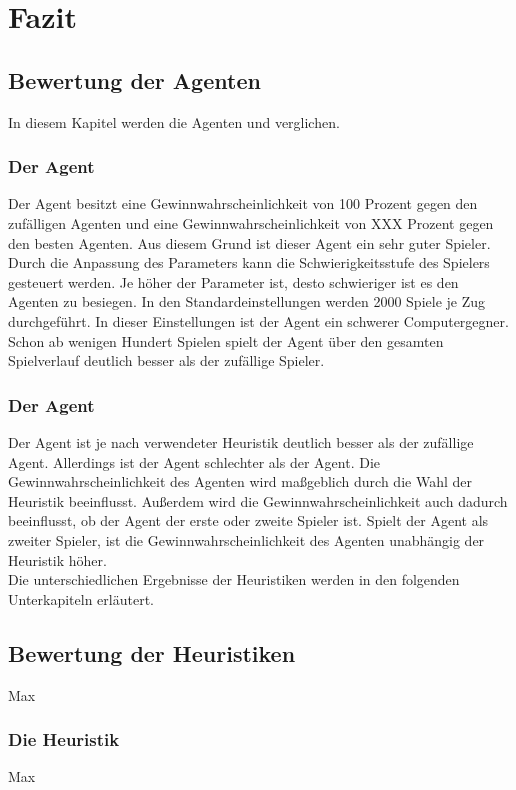 \chapter{Fazit}

\section{Bewertung der Agenten}
In diesem Kapitel werden die Agenten  und  verglichen.
\subsection{Der Agent }
Der  Agent besitzt eine Gewinnwahrscheinlichkeit von 100 Prozent gegen den zufälligen Agenten und eine Gewinnwahrscheinlichkeit von XXX  Prozent gegen den besten  Agenten. Aus diesem Grund ist dieser Agent ein sehr guter Spieler. Durch die Anpassung des Parameters  kann die Schwierigkeitsstufe des Spielers gesteuert werden. Je höher der Parameter ist, desto schwieriger ist es den Agenten zu besiegen. In den Standardeinstellungen werden 2000  Spiele je Zug durchgeführt. In dieser Einstellungen ist der Agent ein schwerer Computergegner. Schon ab wenigen Hundert Spielen spielt der Agent über den gesamten Spielverlauf deutlich besser als der zufällige Spieler.
\subsection{Der Agent }
Der  Agent ist je nach verwendeter Heuristik deutlich besser als der zufällige Agent. Allerdings ist  der Agent schlechter als der  Agent. Die Gewinnwahrscheinlichkeit des Agenten wird maßgeblich durch die Wahl der Heuristik beeinflusst. Außerdem wird die Gewinnwahrscheinlichkeit auch dadurch beeinflusst, ob der Agent der erste oder zweite Spieler ist. Spielt der Agent als zweiter Spieler, ist die Gewinnwahrscheinlichkeit des Agenten unabhängig der Heuristik höher.
\\Die unterschiedlichen Ergebnisse der Heuristiken werden in den folgenden Unterkapiteln erläutert.
\section{Bewertung der Heuristiken}
Max
\subsection{Die Heuristik }
Max

